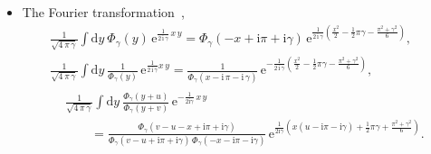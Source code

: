 \documentclass[12pt]{article}
\numberwithin{equation}{section}
\begin{document}
\begin{itemize}
  \item
    The Fourier transformation~\cite{FaddKashVolk00a,PonsoTesch00a},
    \begin{subequations}
      \label{Fourier_transform}
      \begin{gather}
        \frac{1}{\sqrt{4 \, \pi \, \gamma}}
        \int \mathrm{d} y \ \Phi_\gamma(y) \,
        \mathrm{e}^{\frac{1}{2 \, \mathrm{i} \, \gamma} \, x \, y}
        =
        \Phi_\gamma(-x + \mathrm{i} \pi + \mathrm{i} \gamma)
        \,
        \mathrm{e}^{
          \frac{1}{2 \, \mathrm{i} \, \gamma}
          \left(
            \frac{x^2}{2}
            - \frac{1}{2} \pi \gamma
            -
            \frac{\pi^2 + \gamma^2}{6}
          \right)
          } ,
        \\[2mm]
%
        \frac{1}{\sqrt{4 \, \pi \, \gamma}}
        \int \mathrm{d} y \
        \frac{1}{\Phi_\gamma(y)} \,
        \mathrm{e}^{
          \frac{1}{2 \, \mathrm{i} \, \gamma} x \, y
          }
        =
        \frac{1}{
          \Phi_\gamma(x - \mathrm{i}\, \pi - \mathrm{i}\, \gamma)
          } \,
        \mathrm{e}^{
          -\frac{1}{2 \, \mathrm{i} \, \gamma}
          \left(
            \frac{x^2}{2}
            - \frac{1}{2} \pi \gamma
            - \frac{\pi^2+\gamma^2}{6}
          \right)
          } ,
        \\[2mm]
%
        \begin{split}
          & \frac{1}{\sqrt{4 \, \pi \, \gamma}}
          \int \mathrm{d} y \
          \frac{\Phi_\gamma(y+u)}{\Phi_\gamma(y+v)} \,
          \mathrm{e}^{
            -\frac{1}{2 \mathrm{i} \gamma} \, x \, y
            }
          \\
          & \qquad =
          \frac{
            \Phi_\gamma(v-u-x+\mathrm{i}\pi + \mathrm{i}\gamma)
            }{
            \Phi_\gamma(v-u+\mathrm{i}\pi + \mathrm{i}\gamma) \,
            \Phi_\gamma(-x-\mathrm{i}\pi - \mathrm{i}\gamma)
            } \,
          \mathrm{e}^{
            \frac{1}{2 \mathrm{i} \gamma}
            \left(
              x ( u- \mathrm{i} \pi - \mathrm{i} \gamma)
              +
              \frac{1}{2} \pi \gamma
              +
              \frac{\pi^2+\gamma^2}{6}
            \right)
            } .
        \end{split}
      \end{gather}
    \end{subequations}
\end{itemize}
\end{document}
